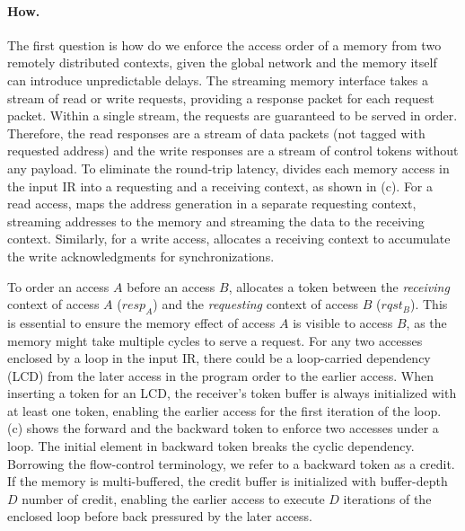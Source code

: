 
\paragraph{How.} 
The first question is how do we enforce the access order of a memory from two remotely distributed contexts, given the
global network and the memory itself can introduce unpredictable delays.
The streaming memory interface takes a stream of read or write requests, providing a response
packet for each request packet.
Within a single stream, the requests are guaranteed to be served in order. 
Therefore, the read responses are a stream of data packets (not tagged with requested address) and the
write responses are a stream of control tokens without any payload.
To eliminate the round-trip latency, \name divides each memory access in the input IR into a requesting and a receiving context, as shown in  (c). 
For a read access, \name maps the address generation in a separate requesting context, streaming
addresses to the memory and streaming the data to the receiving context.
Similarly, for a write access, \name allocates a receiving context to accumulate the write acknowledgments for synchronizations.

To order an access $A$ before an access $B$,
\name allocates a token between the \emph{receiving} context of access $A$ ($resp_A$) and the
\emph{requesting} context of access $B$ ($rqst_B$).
This is essential to ensure the memory effect of access $A$ is visible to access $B$, as the memory
might take multiple cycles to serve a request.
For any two accesses enclosed by a loop in the input IR, there could be a loop-carried dependency (LCD) from
the later access in the program order to the earlier access.
When inserting a token for an LCD, the receiver's token buffer is always initialized with at least one token,
enabling the earlier access for the first iteration of the loop.  (c) shows the
forward and the backward token to enforce two accesses under a loop. The initial element in backward
token breaks the cyclic dependency. 
Borrowing the flow-control
terminology\cite{credit}, we refer to a backward token as a credit.
If the memory is multi-buffered, the credit buffer is initialized with buffer-depth $D$ number of credit, 
enabling the earlier access to execute $D$ iterations of the enclosed loop before back pressured by the later access.

